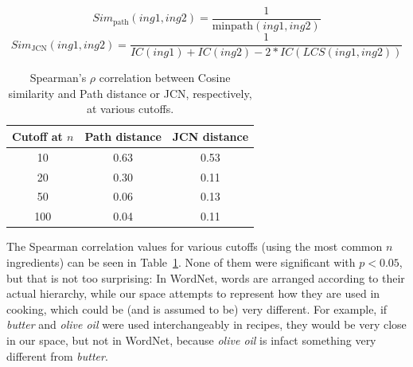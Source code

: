 \begin{equation} \label{eq:path}
    Sim_{\mathrm{path}}(ing1, ing2) = \frac{1}{\mathrm{minpath}(ing1, ing2)}
\end{equation}
\begin{equation} \label{eq:jcn}
    Sim_{\mathrm{JCN}}(ing1, ing2) = \frac{1}{IC(ing1) + IC(ing2) - 2 * IC(LCS(ing1,ing2))}
\end{equation}

\begin{table}
    \begin{center}
        \begin{tabular}{ccc}
            \toprule
            \textbf{Cutoff at $n$} & \textbf{Path distance} & \textbf{JCN distance} \\
            \midrule
            10 & 0.63 & 0.53\\
            20 & 0.30 & 0.11\\
            50 & 0.06 & 0.13\\
            100 & 0.04 & 0.11\\
            \bottomrule
        \end{tabular}
    \end{center}
    \caption{Spearman's $\rho$ correlation between Cosine similarity and Path distance or JCN, respectively, at various cutoffs.}\label{tab:wordnet}
\end{table}

The Spearman correlation values for various cutoffs (using the most common $n$ ingredients) can be seen in Table~\ref{tab:wordnet}. None of them were significant with $p < 0.05$, but that is not too surprising: In WordNet, words are arranged according to their actual hierarchy, while our space attempts to represent how they are used in cooking, which could be (and is assumed to be) very different. For example, if \textit{butter} and \textit{olive oil} were used interchangeably in recipes, they would be very close in our space, but not in WordNet, because \textit{olive oil} is infact something very different from \textit{butter}.

